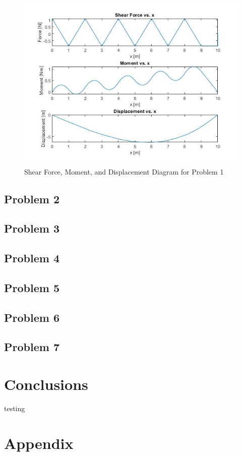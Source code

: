 \documentclass[a4paper]{article}
\begin{document}
\begin{figure}[h]
\includegraphics[width=\textwidth]{results/solution1.jpg}
\caption{Shear Force, Moment, and Displacement Diagram for Problem 1}
\label{Solution_1}
\end{figure}


\subsection{Problem 2}
\lipsum[1]
\subsection{Problem 3}
\lipsum[1]
\subsection{Problem 4}
\lipsum[1]
\subsection{Problem 5}
\lipsum[1]
\subsection{Problem 6}
\lipsum[1]
\subsection{Problem 7}
\lipsum[1]

\section{Conclusions} \label{Conclusions}
testing \cite{book}

\section{Appendix}
\lipsum[1]




\end{document}
